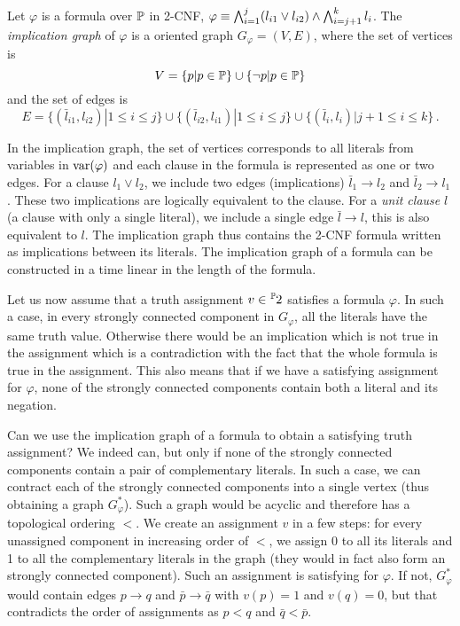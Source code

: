 \begin{definition}
Let $\varphi$ is a formula over $\mathbb{P}$ in 2-CNF, $\varphi \equiv \bigwedge_{i=1}^j (l_{i1} \lor l_{i2}) \land \bigwedge_{i=j+1}^k l_{i}$. The \emph{implication graph} of $\varphi$ is a oriented graph $G_\varphi = (V, E)$, where the set of vertices is $$V = \{p | p \in \mathbb{P}\} \cup \{\neg p | p \in \mathbb{P}\}$$ and the set of edges is $$E = \{(\bar{l}_{i1}, l_{i2}) | 1 \leq i \leq j\} \cup \{(\bar{l}_{i2}, l_{i1}) | 1 \leq i \leq j \} \cup \{(\bar{l}_i, l_i) | j + 1 \leq i \leq k\}\,.$$
\end{definition}

In the implication graph, the set of vertices corresponds to all literals from variables in $\operatorname{var}(\varphi)$ and each clause in the formula is represented as one or two edges. For a clause $l_1 \lor l_2$, we include two edges (implications) $\bar{l}_1 \to l_2$ and $\bar{l}_2 \to l_1$. These two implications are logically equivalent to the clause. For a \emph{unit clause} $l$ (a clause with only a single literal), we include a single edge $\bar{l} \to l$, this is also equivalent to $l$. The implication graph thus contains the 2-CNF formula written as implications between its literals. The implication graph of a formula can be constructed in a time linear in the length of the formula.

Let us now assume that a truth assignment $v \in \fset{\Prop}{2}$ satisfies a formula $\varphi$. In such a case, in every strongly connected component in $G_\varphi$, all the literals have the same truth value. Otherwise there would be an implication which is not true in the assignment which is a contradiction with the fact that the whole formula is true in the assignment. This also means that if we have a satisfying assignment for $\varphi$, none of the strongly connected components contain both a literal and its negation. 

Can we use the implication graph of a formula to obtain a satisfying truth assignment? We indeed can, but only if none of the strongly connected components contain a pair of complementary literals. In such a case, we can contract each of the strongly connected components into a single vertex (thus obtaining a graph $G_\varphi^*$). Such a graph would be acyclic and therefore has a topological ordering $<$. We create an assignment $v$ in a few steps: for every unassigned component in increasing order of $<$, we assign 0 to all its literals and 1 to all the complementary literals in the graph (they would in fact also form an strongly connected component). Such an assignment is satisfying for $\varphi$. If not, $G_\varphi^*$ would contain edges $p \to q$ and $\bar{p}\to\bar{q}$ with $v(p) = 1$ and $v(q) = 0$, but that contradicts the order of assignments as $p < q$ and $\bar{q} < \bar{p}$.

